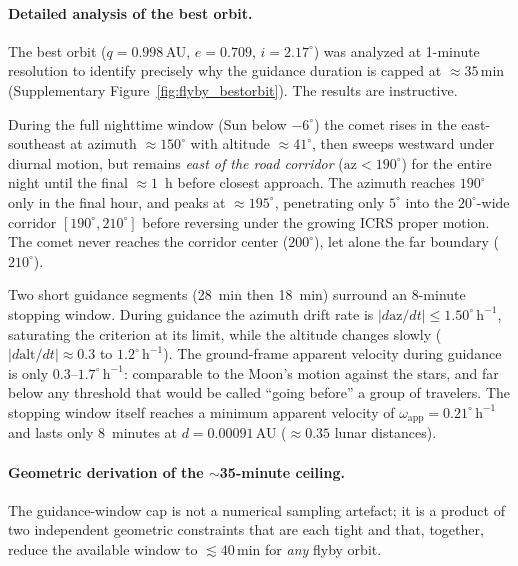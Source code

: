 \documentclass[11pt,a4paper]{article}
\begin{document}
\paragraph{Detailed analysis of the best orbit.}
The best orbit ($q=0.998$\,AU, $e=0.709$, $i=2.17^\circ$) was analyzed at
1-minute resolution to identify precisely why the guidance duration is capped
at $\approx\!35$\,min (Supplementary Figure~\ref{fig:flyby_bestorbit}). The results are
instructive.

During the full nighttime window (Sun below $-6^\circ$) the comet rises in the
east-southeast at azimuth $\approx\!150^\circ$ with altitude $\approx\!41^\circ$,
then sweeps westward under diurnal motion, but remains \emph{east of the road
corridor} ($\mathrm{az} < 190^\circ$) for the entire night until the final
$\approx\!1$~h before closest approach. The azimuth reaches $190^\circ$ only
in the final hour, and peaks at $\approx\!195^\circ$, penetrating only
$5^\circ$ into the $20^\circ$-wide corridor $[190^\circ, 210^\circ]$ before
reversing under the growing ICRS proper motion. The comet never reaches the
corridor center ($200^\circ$), let alone the far boundary ($210^\circ$).

Two short guidance segments (28~min then 18~min) surround an 8-minute stopping
window. During guidance the azimuth drift rate is $|d\mathrm{az}/dt| \leq
1.50^\circ\,\mathrm{h}^{-1}$, saturating the criterion at its limit,
while the altitude changes slowly ($|d\mathrm{alt}/dt| \approx 0.3$ to
$1.2^\circ\,\mathrm{h}^{-1}$). The ground-frame apparent velocity during
guidance is only $0.3$--$1.7^\circ\,\mathrm{h}^{-1}$: comparable to the Moon's
motion against the stars, and far below any threshold that would be called
``going before'' a group of travelers. The stopping window itself reaches a
minimum apparent velocity of $\omega_\mathrm{app} = 0.21^\circ\,\mathrm{h}^{-1}$
and lasts only 8~minutes at $d = 0.00091$\,AU ($\approx\!0.35$ lunar distances).

\paragraph{Geometric derivation of the $\sim$35-minute ceiling.}
The guidance-window cap is not a numerical sampling artefact; it is a product of
two independent geometric constraints that are each tight and that, together,
reduce the available window to $\lesssim\!40$\,min for \emph{any} flyby orbit.
\end{document}
